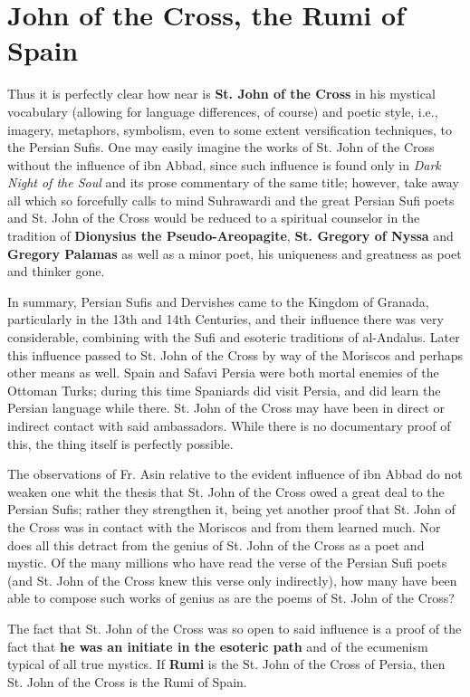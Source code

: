 \section{John of the Cross, the Rumi of Spain}

Thus it is perfectly clear how near is \textbf{St. John of the Cross} in his mystical vocabulary (allowing for language differences, of course) and poetic style, i.e., imagery, metaphors, symbolism, even to some extent versification techniques, to the Persian Sufis. One may easily imagine the works of St. John of the Cross without the influence of ibn Abbad, since such influence is found only in \emph{Dark Night of the Soul} and its prose commentary of the same title; however, take away all which so forcefully calls to mind Suhrawardi and the great Persian Sufi poets and St. John of the Cross would be reduced to a spiritual counselor in the tradition of \textbf{Dionysius the Pseudo-Areopagite}, \textbf{St. Gregory of Nyssa} and \textbf{Gregory Palamas} as well as a minor poet, his uniqueness and greatness as poet and thinker gone.

In summary, Persian Sufis and Dervishes came to the Kingdom of Granada, particularly in the 13th and 14th Centuries, and their influence there was very considerable, combining with the Sufi and esoteric traditions of al-Andalus. Later this influence passed to St. John of the Cross by way of the Moriscos and perhaps other means as well. Spain and Safavi Persia were both mortal enemies of the Ottoman Turks; during this time Spaniards did visit Persia, and did learn the Persian language while there. St. John of the Cross may have been in direct or indirect contact with said ambassadors. While there is no documentary proof of this, the thing itself is perfectly possible.

The observations of Fr. Asin relative to the evident influence of ibn Abbad do not weaken one whit the thesis that St. John of the Cross owed a great deal to the Persian Sufis; rather they strengthen it, being yet another proof that St. John of the Cross was in contact with the Moriscos and from them learned much. Nor does all this detract from the genius of St. John of the Cross as a poet and mystic. Of the many millions who have read the verse of the Persian Sufi poets (and St. John of the Cross knew this verse only indirectly), how many have been able to compose such works of genius as are the poems of St. John of the Cross?

The fact that St. John of the Cross was so open to said influence is a proof of the fact that \textbf{he was an initiate in the esoteric path} and of the ecumenism typical of all true mystics. If \textbf{Rumi} is the St. John of the Cross of Persia, then St. John of the Cross is the Rumi of Spain.


